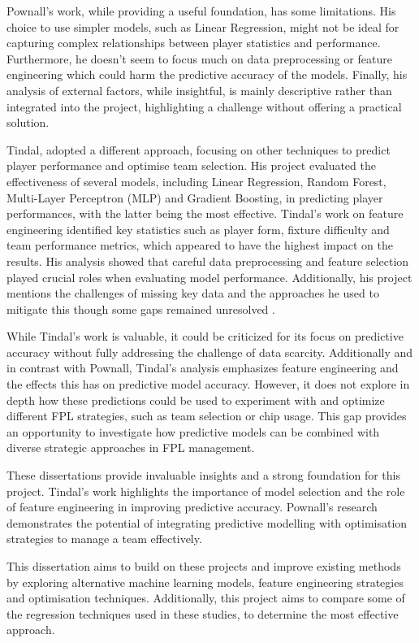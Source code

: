 Pownall's work, while providing a useful foundation, has some limitations. His choice to use simpler models, such as Linear Regression, might not be ideal for capturing complex relationships between player statistics and performance. Furthermore, he doesn’t seem to focus much on data preprocessing or feature engineering which could harm the predictive accuracy of the models. Finally, his analysis of external factors, while insightful, is mainly descriptive rather than integrated into the project, highlighting a challenge without offering a practical solution.

Tindal, adopted a different approach, focusing on other techniques to predict player performance and optimise team selection. His project evaluated the effectiveness of several models, including Linear Regression, Random Forest, Multi-Layer Perceptron (MLP) and Gradient Boosting, in predicting player performances, with the latter being the most effective. Tindal's work on feature engineering identified key statistics such as player form, fixture difficulty and team performance metrics, which appeared to have the highest impact on the results. His analysis showed that careful data preprocessing and feature selection played crucial roles when evaluating model performance. Additionally, his project mentions the challenges of missing key data and the approaches he used to mitigate this though some gaps remained unresolved \cite{tindal2023fantasyfootball}.

While Tindal’s work is valuable, it could be criticized for its focus on predictive accuracy without fully addressing the challenge of data scarcity. Additionally and in contrast with Pownall, Tindal’s analysis emphasizes feature engineering and the effects this has on predictive model accuracy. However, it does not explore in depth how these predictions could be used to experiment with and optimize different FPL strategies, such as team selection or chip usage. This gap provides an opportunity to investigate how predictive models can be combined with diverse strategic approaches in FPL management.

These dissertations provide invaluable insights and a strong foundation for this project. Tindal’s work highlights the importance of model selection and the role of feature engineering in improving predictive accuracy. Pownall’s research demonstrates the potential of integrating predictive modelling with optimisation strategies to manage a team effectively.

This dissertation aims to build on these projects and improve existing methods by exploring alternative machine learning models, feature engineering strategies and optimisation techniques. Additionally, this project aims to compare some of the regression techniques used in these studies, to determine the most effective approach.

